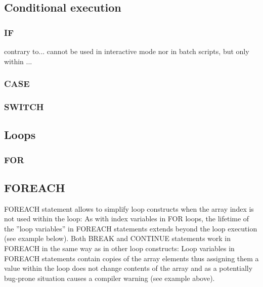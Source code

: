 \subsection{Conditional execution}
\subsubsection{IF%
}
contrary to... cannot be used in interactive mode nor in batch scripts, but only within ...

\subsubsection{CASE%
}
\subsubsection{SWITCH%
}
\subsection{Loops}
\subsubsection{FOR%
}
\subsection{FOREACH%
}
FOREACH statement allows to simplify loop constructs when the array 
  index is not used within the loop:
As with index variables in FOR loops, the lifetime of the ''loop variables''
  in FOREACH statements extends beyond the loop execution (see example below).
Both BREAK and CONTINUE statements work in FOREACH in the same way as in other 
  loop constructs:
Loop variables in FOREACH statements contain copies of the array elements
  thus assigning them a value within the loop does not change contents 
  of the array and as a potentially bug-prone situation causes a compiler
  warning (see example above).
